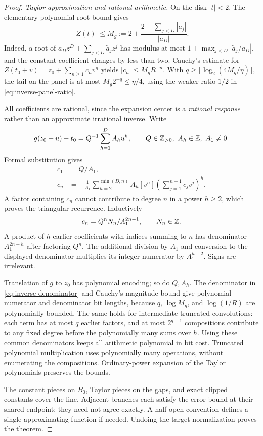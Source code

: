 \begin{proof}
\emph{Taylor approximation and rational arithmetic.}
On the disk $|t|<2$. The elementary polynomial root bound gives
\[
 |Z(t)|\le M_g:=2+\frac{2+\sum_{j<D}|a_j|}{|a_D|}.
\]
Indeed, a root of $a_Dz^D+\sum_{j<D}\widetilde a_jz^j$ has
modulus at most $1+\max_{j<D}|\widetilde a_j/a_D|$, and the
constant coefficient changes by less than two. Cauchy's estimate for
$Z(t_0+v)=z_0+\sum_{n\ge1}c_nv^n$ yields
$|c_n|\le M_gR^{-n}$. With
$q\ge\lceil\log_2(4M_g/\eta)\rceil$, the tail on the panel is
at most $M_g2^{-q}\le\eta/4$, using the weaker ratio $1/2$ in
\eqref{eq:inverse-panel-ratio}.

All coefficients are rational, since the expansion center is a
\emph{rational response} rather than an approximate irrational inverse.
Write
\[
 g(z_0+u)-t_0=Q^{-1}\sum_{h=1}^D A_hu^h,
 \qquad Q\in\mathbb Z_{>0},\ A_h\in\mathbb Z,\ A_1\ne0.
\]
Formal substitution gives
\begin{equation}\label{eq:inverse-reversion}
 \begin{split}
 c_1&=Q/A_1,\\
 c_n&=-\frac1{A_1}\sum_{h=2}^{\min(D,n)}A_h[v^n]
                       \left(\sum_{j=1}^{n-1}c_jv^j\right)^h.
 \end{split}
\end{equation}
A factor containing $c_n$ cannot contribute to degree $n$ in a power
$h\ge2$, which proves the triangular recurrence. Inductively
\begin{equation}\label{eq:inverse-denominator}
                    c_n=Q^nN_n/A_1^{2n-1},\qquad N_n\in\mathbb Z.
\end{equation}
A product of $h$ earlier coefficients with indices summing to $n$
has denominator $A_1^{2n-h}$ after factoring $Q^n$. The additional
division by $A_1$ and conversion to the displayed denominator multiplies
its integer numerator by $A_1^{h-2}$. Signs are irrelevant.

Translation of $g$ to $z_0$ has polynomial encoding; so do $Q,A_h$.
The denominator in \eqref{eq:inverse-denominator} and Cauchy's magnitude
bound give polynomial numerator and denominator bit lengths, because
$q$, $\log M_g$, and $\log(1/R)$ are polynomially bounded. The same
holds for intermediate truncated convolutions: each term has at most
$q$ earlier factors, and at most $2^{q-1}$ compositions contribute to
any fixed degree before the polynomially many sums over $h$.
Using these common denominators keeps all arithmetic polynomial in bit
cost. Truncated polynomial multiplication uses polynomially many
operations, without enumerating the compositions. Ordinary-power
expansion of the Taylor polynomials preserves the bounds.

The constant pieces on $B_0$, Taylor pieces on the gaps, and exact
clipped constants cover the line. Adjacent branches each satisfy the
error bound at their shared endpoint; they need not agree exactly.
A half-open convention defines a single approximating function if needed.
Undoing the target normalization proves the theorem.
\end{proof}

